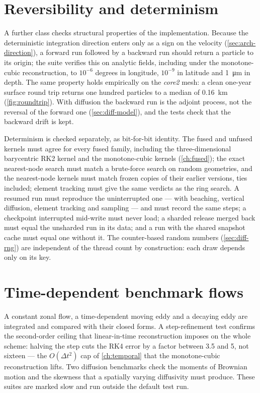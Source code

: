 \section{Reversibility and determinism}\label{sec:val-reversibility}

A further class checks structural properties of the implementation. Because the deterministic integration
direction enters only as a sign on the velocity (\cref{sec:arch-direction}), a forward run followed by a
backward run should return a particle to its origin; the suite verifies this on analytic fields, including
under the monotone-cubic reconstruction, to $10^{-6}$ degrees in longitude, $10^{-9}$ in latitude and
\SI{1}{\micro\metre} in depth. The same property holds empirically on the \emph{core2} mesh: a clean one-year
surface round trip returns one hundred particles to a median of \SI{0.16}{\kilo\metre} (\cref{fig:roundtrip}).
With diffusion the backward run is the adjoint process, not the reversal of the forward one
(\cref{sec:diff-model}), and the tests check that the backward drift is kept.

Determinism is checked separately, as bit-for-bit identity. The fused and unfused kernels must agree for every
fused family, including the three-dimensional barycentric RK2 kernel and the monotone-cubic kernels
(\cref{ch:fused}); the exact nearest-node search must match a brute-force search on random geometries, and the
nearest-node kernels must match frozen copies of their earlier versions, ties included; element tracking must
give the same verdicts as the ring search. A resumed run must reproduce the uninterrupted one --- with
beaching, vertical diffusion, element tracking and sampling --- and must record the same steps; a checkpoint
interrupted mid-write must never load; a sharded release merged back must equal the unsharded run in its
data; and a run with the shared snapshot cache must equal one without it. The counter-based random numbers (\cref{sec:diff-rng}) are
independent of the thread count by construction: each draw depends only on its key.

\section{Time-dependent benchmark flows}\label{sec:val-benchmarks}

A constant zonal flow, a time-dependent moving eddy and a decaying eddy are integrated and compared with
their closed forms. A step-refinement test confirms the second-order ceiling
that linear-in-time reconstruction imposes on the whole scheme: halving the step cuts the RK4 error by a factor
between 3.5 and 5, not sixteen --- the $O(\Delta t^2)$ cap of \cref{ch:temporal} that the monotone-cubic
reconstruction lifts. Two diffusion benchmarks check the moments of Brownian motion and the skewness that a
spatially varying diffusivity must produce. These suites are marked slow and run outside the default test
run.

